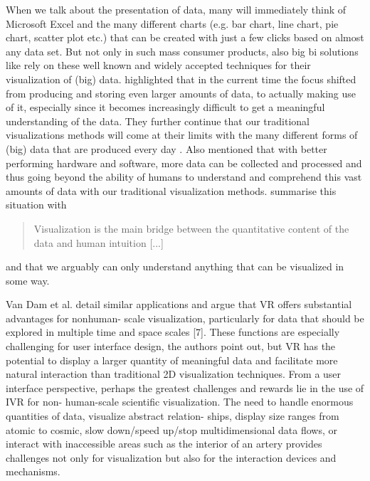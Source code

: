 When we talk about the presentation of data, many will immediately think of Microsoft Excel and the many different charts (e.g. bar chart, line chart, pie chart, scatter plot etc.) that can be created with just a few clicks based on almost any data set. But not only in such mass consumer products, also big \gls{bi} solutions like \cite{TableauSoftware2016} rely on these well known and widely accepted techniques for their visualization of (big) data. \newline
\cite{Jamieson2007} highlighted that in the current time the focus shifted from producing and storing even larger amounts of data, to actually making use of it, especially since it becomes increasingly difficult to get a meaningful understanding of the data. They further continue that our traditional visualizations methods will come at their limits with the many different forms of (big) data that are produced every day \citep{Jamieson2007}. Also \cite{Sarathy2000} mentioned that with better performing hardware and software, more data can be collected and processed and thus going beyond the ability of humans to understand and comprehend this vast amounts of data with our traditional visualization methods. \cite[p.609]{Donalek2014} summarise this situation with \blockquote{Visualization is the main bridge between the quantitative content of the data and human intuition [...]} and that we arguably can only understand anything that can be visualized in some way. \newline






Van Dam et al. detail similar applications and argue that VR offers substantial advantages for nonhuman- scale visualization, particularly for data that should be explored in multiple time and space scales [7]. These functions are especially challenging for user interface design, the authors point out, but VR has the potential to display a larger quantity of meaningful data and facilitate more natural interaction than traditional 2D visualization techniques.
\cite{Drouhard2015}
From a user interface perspective, perhaps the greatest challenges and rewards lie in the use of IVR for non- human-scale scientific visualization. The need to handle enormous quantities of data, visualize abstract relation- ships, display size ranges from atomic to cosmic, slow down/speed up/stop multidimensional data flows, or interact with inaccessible areas such as the interior of an artery provides challenges not only for visualization but also for the interaction devices and mechanisms.
\cite{VanDam2002}

